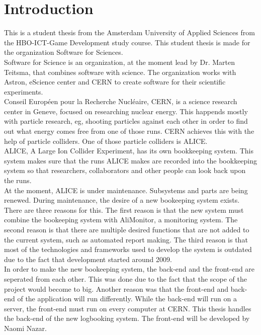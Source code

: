 \documentclass[paper=a4, fontsize=11pt,twoside]{scrartcl}	%
\begin{document}
\section{Introduction}
This is a student thesis from the Amsterdam University of Applied Sciences from the HBO-ICT-Game Development study course. This student thesis is made for the organization Software for Sciences. \\
Software for Science is an organization, at the moment lead by Dr. Marten Teitsma, that combines software with science. The organization works with Astron, eScience center and CERN to create software for their scientific experiments. \\
Conseil Européen pour la Recherche Nucléaire, CERN, is a science research center in Geneve, focused on researching nuclear energy. This happends mostly with particle research, eg, shooting particles against each other in order to find out what energy comes free from one of those runs. CERN achieves this with the help of particle colliders. One of those particle colliders is ALICE. \\
ALICE, A Large Ion Collider Experiment, has its own bookkeeping system. This system makes sure that the runs ALICE makes are recorded into the bookkeeping system so that researchers, collaborators and other people can look back upon the runs.  \\
At the moment, ALICE is under maintenance. Subsystems and parts are being renewed. During maintenance, the desire of a new bookeeping system exists. There are three reasons for this. The first reason is that the new system must combine the bookeeping system with AliMonitor, a monitoring system. The second reason is that there are multiple desired functions that are not added to the current system, such as automated report making. The third reason is that most of the technologies and frameworks used to develop the system is outdated due to the fact that development started around 2009.\\
In order to make the new bookeeping system, the back-end and the front-end are seperated from each other. This was done due to the fact that the scope of the project would become to big. Another reason was that the front-end and back-end of the application will run differently. While the back-end will run on a server, the front-end must run on every computer at CERN. This thesis handles the back-end of the new logbooking system. The front-end will be developed by Naomi Nazar. 
 
\end{document}
